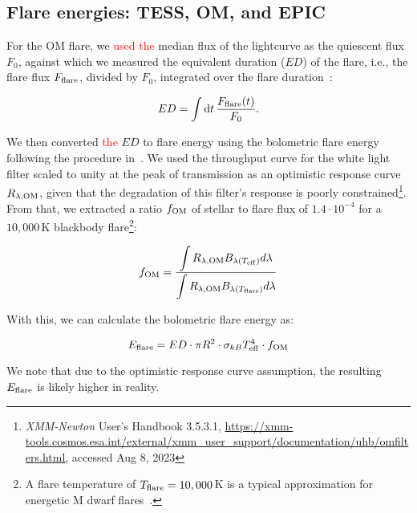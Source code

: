 \documentclass[twocolumn]{aastex631}
\begin{document}
\subsection{Flare energies: TESS, OM, and EPIC}
\label{sec:methods:flareenergies}
For the OM flare, we \textcolor{red}{used the} median flux of the lightcurve as the quiescent flux $F_0$, against which we measured the equivalent duration ($ED$) of the flare, i.e., the flare flux $F_{\rm flare}$, divided by $F_0$, integrated over the flare duration~\citep{gershberg1972results}:

\begin{equation}
\label{eq:ED}
ED=\displaystyle \int \mathrm dt\, \frac{F_{\rm flare}(t)}{F_0}.
\end{equation}

We then converted \textcolor{red}{the} $ED$ to flare energy using the bolometric flare energy following the procedure in~\citet{shibayama2013superflares}. We used the throughput curve for the white light filter scaled to unity at the peak of transmission as an optimistic response curve $R_{\lambda, \rm OM}$, given that the degradation of this filter's response is poorly constrained\footnote{\textit{XMM-Newton} User's Handbook 3.5.3.1, \url{https://xmm-tools.cosmos.esa.int/external/xmm_user_support/documentation/uhb/omfilters.html}, accessed Aug 8, 2023}. From that, we extracted a ratio $f_{\rm OM}$ of stellar to flare flux of $1.4\cdot 10^{-4}$ for a $10,000\,$K blackbody flare\footnote{A flare temperature of $T_{\rm flare}=10,000\,$K is a typical approximation for energetic M dwarf flares~\citep{kowalski2013timeresolved, howard2020evryflarea}.}:

\begin{equation}
    f_{\rm OM} = \frac{\displaystyle\int R_{\lambda, \rm OM} B_{\lambda(T_{\rm eff})}  d\lambda}{\displaystyle\int R_{\lambda, \rm OM} B_{\lambda(T_{\rm flare})} d\lambda} 
    \label{eq:ratio}
\end{equation}

With this, we can calculate the bolometric flare energy as:

\begin{equation}
    E_{\rm flare} = ED \cdot \pi R^2 \cdot \sigma_{kB} T_{\rm eff}^4 \cdot f_{\rm OM}
    \label{eq:eflare}
\end{equation}

We note that due to the optimistic response curve assumption, the resulting $E_{\rm flare}$ is likely higher in reality.

\end{document}
